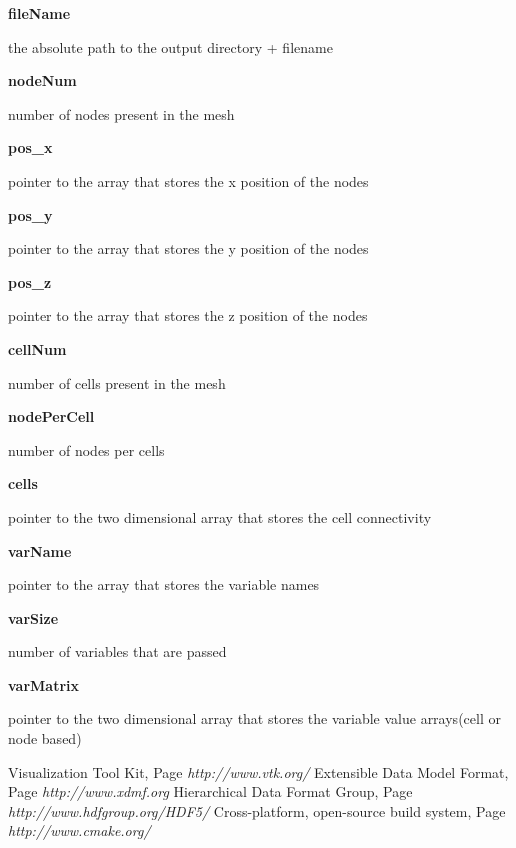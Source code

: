 \documentclass{article}
\begin{document}
        {\bf fileName}  \par the absolute path to the output directory + filename
\medskip
        
        {\bf nodeNum} \par number of nodes present in the mesh
\medskip
        
        {\bf pos\_x} \par pointer to the array that stores the x position of the nodes
\medskip
        
        {\bf pos\_y} \par pointer to the array that stores the y position of the nodes
\medskip
        
        {\bf pos\_z} \par pointer to the array that stores the z position of the nodes
\medskip
        
        {\bf cellNum} \par number of cells present in the mesh
\medskip
        
        {\bf nodePerCell} \par number of nodes per cells 
\medskip
        
        {\bf cells} \par pointer to the two dimensional array that stores the cell connectivity
\medskip
        
        {\bf varName} \par pointer to the array that stores the variable names
\medskip
        
        {\bf varSize} \par number of variables that are passed 
\medskip
        
        {\bf varMatrix} \par pointer to the two dimensional array that stores the variable value arrays(cell or node based) 

        


  \begin{thebibliography}{1}

   Visualization Tool Kit, Page {\em http://www.vtk.org/}
   Extensible Data Model Format, Page {\em http://www.xdmf.org}
   Hierarchical Data Format Group, Page {\em http://www.hdfgroup.org/HDF5/}
   Cross-platform, open-source build system, Page {\em http://www.cmake.org/}
%
  \end{thebibliography}
\end{document}
